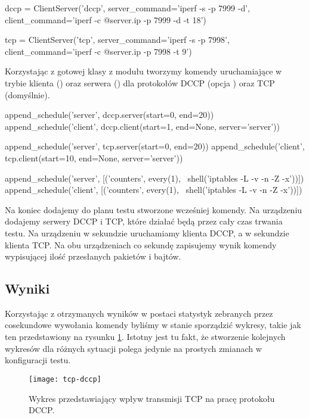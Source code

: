 \documentclass[00-praca-magisterska.tex]{subfiles}
\begin{document}
\begin{pythoncode}
  dccp = ClientServer('dccp',
      server_command='iperf -s -p 7999 -d',
      client_command='iperf -c @{server.ip} -p 7999 -d -t 18')
\end{pythoncode}
\begin{pythoncode}
  tcp = ClientServer('tcp',
      server_command='iperf -s -p 7998',
      client_command='iperf -c @{server.ip} -p 7998 -t 9')
\end{pythoncode}

Korzystając z gotowej klasy  z modułu  tworzymy
komendy uruchamiające  w trybie klienta () oraz serwera
() dla protokołów DCCP (opcja ) oraz TCP (domyślnie).

\begin{pythoncode}
  append_schedule('server', dccp.server(start=0, end=20))
  append_schedule('client', dccp.client(start=1, end=None, server='server'))

  append_schedule('server', tcp.server(start=0, end=20))
  append_schedule('client', tcp.client(start=10, end=None, server='server'))

  append_schedule('server', [('counters', every(1), \
      shell('iptables -L -v -n -Z -x'))])
  append_schedule('client', [('counters', every(1), \
      shell('iptables -L -v -n -Z -x'))])
\end{pythoncode}

Na koniec dodajemy do planu testu stworzone wcześniej komendy. Na urządzeniu
 dodajemy serwery DCCP i TCP, które działać będą przez cały czas
trwania testu. Na urządzeniu \code{client} w \code{1} sekundzie uruchamiamy
klienta DCCP, a w \code{10} sekundzie klienta TCP. Na obu urządzeniach co
sekundę zapisujemy wynik komendy wypisującej ilość przesłanych pakietów i
bajtów.

\subsection{Wyniki}

Korzystając z otrzymanych wyników w postaci statystyk zebranych
przez cosekundowe wywołania komendy  byliśmy w stanie sporządzić
wykresy, takie jak ten przedstawiony na rysunku \ref{fig:tcp-dccp}. Istotny jest
tu fakt, że stworzenie kolejnych wykresów dla różnych sytuacji polega jedynie
na prostych zmianach w konfiguracji testu.

\begin{figure}[htb]
\begin{center}
\leavevmode
\texttt{[image: tcp-dccp]}
\end{center}
\caption{Wykres przedstawiający wpływ transmisji TCP na pracę
protokołu DCCP.}
\label{fig:tcp-dccp}
\end{figure}
\end{document}
